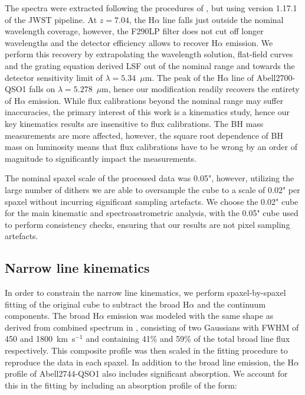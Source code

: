 \documentclass[twocolumn, fleqn]{doc_class}
\begin{document}
The spectra were extracted following the procedures of , but using version 1.17.1 of the JWST pipeline. At $z = 7.04$, the H$\alpha$ line falls just outside the nominal wavelength coverage, however, the F290LP filter does not cut off longer wavelengths and the detector efficiency allows to recover H$\alpha$ emission. We perform this recovery by extrapolating the wavelength solution, flat-field curves and the grating equation derived LSF out of the nominal range and towards the detector sensitivity limit of $\lambda = 5.34$~$\mu$m. The peak of the H$\alpha$ line of Abell2700-QSO1 falls on $\lambda = 5.278$~$\mu$m, hence our modification readily recovers the entirety of H$\alpha$ emission. While flux calibrations beyond the nominal range may suffer inaccuracies, the primary interest of this work is a kinematics study, hence our key kinematics results are insensitive to flux calibrations. The BH mass measurements are more affected, however, the square root dependence of BH mass on luminosity means that flux calibrations have to be wrong by an order of magnitude to significantly impact the measurements.

The nominal spaxel scale of the processed data was 0.05", however, utilizing the large number of dithers we are able to oversample the cube to a scale of 0.02" per spaxel without incurring significant sampling artefacts. We choose the 0.02" cube for the main kinematic and spectroastrometric analysis, with the 0.05" cube used to perform consistency checks, ensuring that our results are not pixel sampling artefacts.

\subsection*{Narrow line kinematics}
In order to constrain the narrow line kinematics, we perform spaxel-by-spaxel fitting of the original cube to subtract the broad H$\alpha$ and the continuum components. The broad H$\alpha$ emission was modeled with the same shape as derived from combined spectrum in , consisting of two Gaussians with FWHM of 450 and 1800~km~s$^{-1}$ and containing 41\% and 59\% of the total broad line flux respectively. This composite profile was then scaled in the fitting procedure to reproduce the data in each spaxel. In addition to the broad line emission, the H$\alpha$ profile of Abell2744-QSO1 also includes significant absorption. We account for this in the fitting by including an absorption profile of the form:
\end{document}
